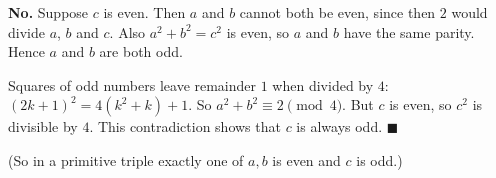 \textbf{No.} Suppose $c$ is even. Then $a$ and $b$ cannot both be even, since then $2$ would divide $a$, $b$ and $c$. Also $a^2+b^2=c^2$ is even, so $a$ and $b$ have the same parity. Hence $a$ and $b$ are both odd.

Squares of odd numbers leave remainder $1$ when divided by $4$: $(2k+1)^2=4(k^2+k)+1$. So $a^2+b^2\equiv2\pmod4$. But $c$ is even, so $c^2$ is divisible by $4$. This contradiction shows that $c$ is always odd. $\blacksquare$

(So in a primitive triple exactly one of $a,b$ is even and $c$ is odd.)

